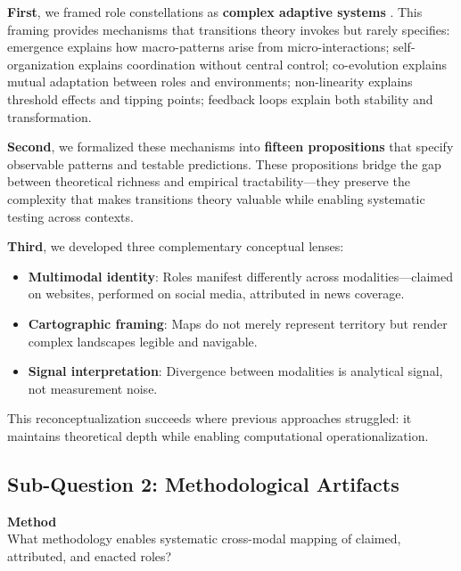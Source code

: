 \documentclass[../main.tex]{subfiles}
\begin{document}
\textbf{First}, we framed role constellations as \textbf{complex adaptive systems} \cite{levin1998ecosystems,sterman2000business}. This framing provides mechanisms that transitions theory invokes but rarely specifies: emergence explains how macro-patterns arise from micro-interactions; self-organization explains coordination without central control; co-evolution explains mutual adaptation between roles and environments; non-linearity explains threshold effects and tipping points; feedback loops explain both stability and transformation.

\textbf{Second}, we formalized these mechanisms into \textbf{fifteen propositions} that specify observable patterns and testable predictions. These propositions bridge the gap between theoretical richness and empirical tractability---they preserve the complexity that makes transitions theory valuable while enabling systematic testing across contexts.

\textbf{Third}, we developed three complementary conceptual lenses:
\begin{itemize}[leftmargin=*, itemsep=0.2em]
\item \textbf{Multimodal identity}: Roles manifest differently across modalities---claimed on websites, performed on social media, attributed in news coverage.
\item \textbf{Cartographic framing}: Maps do not merely represent territory but render complex landscapes legible and navigable.
\item \textbf{Signal interpretation}: Divergence between modalities is analytical signal, not measurement noise.
\end{itemize}

This reconceptualization succeeds where previous approaches struggled: it maintains theoretical depth while enabling computational operationalization.

\subsection{Sub-Question 2: Methodological Artifacts}

\begin{subrq}
\textbf{Method}\\
What methodology enables systematic cross-modal mapping of claimed, attributed, and enacted roles?
\end{subrq}
\end{document}
